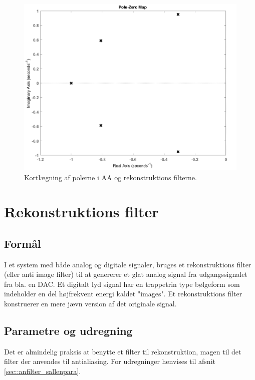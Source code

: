 \begin{figure}[h!]
	\centering
	\includegraphics[scale = 0.4]{./billeder/pzmap}
	\caption{Kortlægning af polerne i AA og rekonstruktions filterne.}
	\label{fig:afilter_pol}
\end{figure}
\FloatBlock
\section{Rekonstruktions filter}
\subsection{Formål}
I et system med både analog og digitale signaler, bruges et rekonstruktions filter (eller anti image filter) til at genererer et glat analog signal fra udgangssignalet fra bla. en DAC. Et digitalt lyd signal har en trappetrin type bølgeform som indeholder en del højfrekvent energi kaldet "images". Et rekonstruktions filter konstruerer en mere jævn version af det originale signal.
\subsection{Parametre og udregning}
Det er almindelig praksis at benytte et filter til rekonstruktion, magen til det filter der anvendes til antialiasing. For udregninger henvises til afsnit \ref{sec::anfilter_sallenpara}.\\


